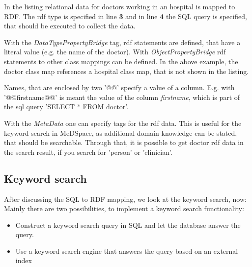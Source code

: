 In the listing relational data for doctors working in an hospital is mapped to RDF. The rdf type is specified in line \textbf{3} and in line \textbf{4} the SQL query is specified, that should be executed to collect the data. 

With the \emph{DataTypePropertyBridge} tag, rdf statements are defined, that have a literal value (e.g. the name of the doctor). 
With \emph{ObjectPropertyBridge} rdf statements to other class mappings can be defined. In the above example, the doctor class map references a hospital class map, that is not shown in the listing. 

Names, that are enclosed by two '@@' specify a value of a column. E.g. with '@@firstname@@' is meant the value of the column \emph{firstname}, which is part of the sql query 'SELECT * FROM doctor'.

With the \emph{MetaData} one can specify tags for the rdf data. This is useful for the keyword search in MeDSpace, as additional domain knowledge can be stated, that should be searchable. Through that, it is possible to get doctor rdf data in the search result, if you search for 'person' or 'clinician'. 

\subsection{Keyword search}

After discussing the SQL to RDF mapping, we look at the keyword search, now:
Mainly there are two possibilities, to implement a keyword search functionality:
\begin{itemize}
	\item {Construct a keyword search query in SQL and let the database answer the query.}
	
	\item {Use a keyword search engine that answers the query based on an external index}
\end{itemize}

